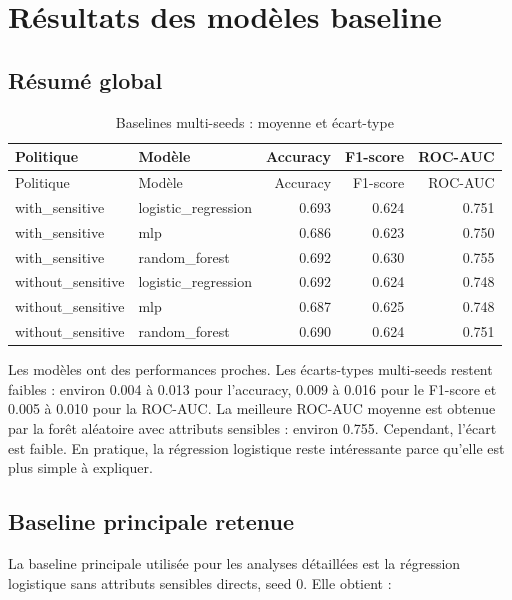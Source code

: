 \documentclass[12pt,a4paper]{report}
\begin{document}
\chapter{Résultats des modèles baseline}

\section{Résumé global}

\begingroup
\small
\setlength{\tabcolsep}{4pt}
\begin{longtable}{@{}llrrr@{}}
\caption{Baselines multi-seeds : moyenne et écart-type}\\
\toprule
Politique & Modèle & Accuracy & F1-score & ROC-AUC \\
\midrule
\endfirsthead
\toprule
Politique & Modèle & Accuracy & F1-score & ROC-AUC \\
\midrule
\endhead
with\_sensitive & logistic\_regression & 0.693 & 0.624 & 0.751 \\
with\_sensitive & mlp & 0.686 & 0.623 & 0.750 \\
with\_sensitive & random\_forest & 0.692 & 0.630 & 0.755 \\
without\_sensitive & logistic\_regression & 0.692 & 0.624 & 0.748 \\
without\_sensitive & mlp & 0.687 & 0.625 & 0.748 \\
without\_sensitive & random\_forest & 0.690 & 0.624 & 0.751 \\
\bottomrule
\end{longtable}
\endgroup

\begin{tcolorbox}[successbox, title={Lecture simple}]
Les modèles ont des performances proches. Les écarts-types multi-seeds restent faibles : environ 0.004 à 0.013 pour l'accuracy, 0.009 à 0.016 pour le F1-score et 0.005 à 0.010 pour la ROC-AUC. La meilleure ROC-AUC moyenne est obtenue par la forêt aléatoire avec attributs sensibles : environ 0.755. Cependant, l'écart est faible. En pratique, la régression logistique reste intéressante parce qu'elle est plus simple à expliquer.
\end{tcolorbox}

\section{Baseline principale retenue}

La baseline principale utilisée pour les analyses détaillées est la régression logistique sans attributs sensibles directs, seed 0. Elle obtient :
\end{document}
